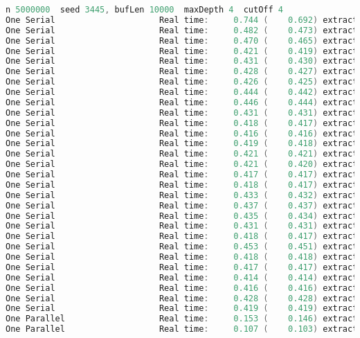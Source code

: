 \documentclass[format=acmsmall, review=false, screen=true]{acmart}
\begin{document}
\begin{lstlisting}[language=java]
n 5000000  seed 3445, bufLen 10000  maxDepth 4  cutOff 4
One Serial                     Real time:     0.744 (    0.692) extract: 5000000
One Serial                     Real time:     0.482 (    0.473) extract: 2500000
One Serial                     Real time:     0.470 (    0.465) extract: 1666666
One Serial                     Real time:     0.421 (    0.419) extract: 1250000
One Serial                     Real time:     0.431 (    0.430) extract: 1000000
One Serial                     Real time:     0.428 (    0.427) extract: 833333
One Serial                     Real time:     0.426 (    0.425) extract: 714285
One Serial                     Real time:     0.444 (    0.442) extract: 625000
One Serial                     Real time:     0.446 (    0.444) extract: 555555
One Serial                     Real time:     0.431 (    0.431) extract: 500000
One Serial                     Real time:     0.418 (    0.417) extract: 454545
One Serial                     Real time:     0.416 (    0.416) extract: 416666
One Serial                     Real time:     0.419 (    0.418) extract: 384615
One Serial                     Real time:     0.421 (    0.421) extract: 357142
One Serial                     Real time:     0.421 (    0.420) extract: 333333
One Serial                     Real time:     0.417 (    0.417) extract: 312500
One Serial                     Real time:     0.418 (    0.417) extract: 294117
One Serial                     Real time:     0.433 (    0.432) extract: 277777
One Serial                     Real time:     0.437 (    0.437) extract: 263157
One Serial                     Real time:     0.435 (    0.434) extract: 250000
One Serial                     Real time:     0.431 (    0.431) extract: 238095
One Serial                     Real time:     0.418 (    0.417) extract: 227272
One Serial                     Real time:     0.453 (    0.451) extract: 217391
One Serial                     Real time:     0.418 (    0.418) extract: 208333
One Serial                     Real time:     0.417 (    0.417) extract: 200000
One Serial                     Real time:     0.414 (    0.414) extract: 192307
One Serial                     Real time:     0.416 (    0.416) extract: 185185
One Serial                     Real time:     0.428 (    0.428) extract: 178571
One Serial                     Real time:     0.419 (    0.419) extract: 172413
One Parallel                   Real time:     0.153 (    0.146) extract: 5000000
One Parallel                   Real time:     0.107 (    0.103) extract: 2500000

\end{lstlisting}
\end{document}
